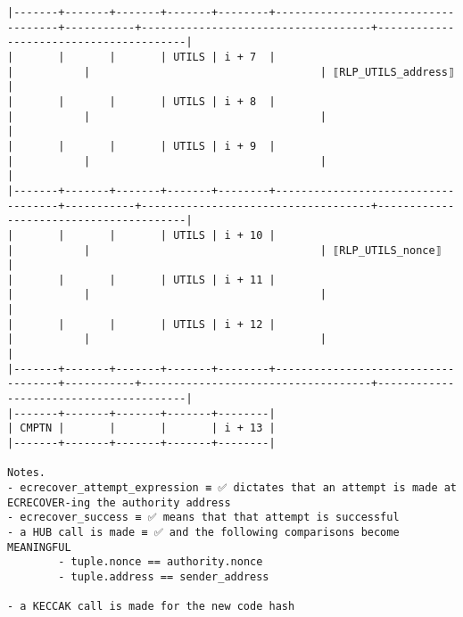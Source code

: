 \documentclass[varwidth=\maxdimen,margin=0.5cm,multi={verbatim}]{standalone}
\begin{document}
\begin{verbatim}
|-------+-------+-------+-------+--------+------------------------------------+-----------+------------------------------------+----------------------------------------|
|       |       |       | UTILS | i + 7  |                                    |           |                                    | ⟦RLP_UTILS_address⟧                    |
|       |       |       | UTILS | i + 8  |                                    |           |                                    |                                        |
|       |       |       | UTILS | i + 9  |                                    |           |                                    |                                        |
|-------+-------+-------+-------+--------+------------------------------------+-----------+------------------------------------+----------------------------------------|
|       |       |       | UTILS | i + 10 |                                    |           |                                    | ⟦RLP_UTILS_nonce⟧                      |
|       |       |       | UTILS | i + 11 |                                    |           |                                    |                                        |
|       |       |       | UTILS | i + 12 |                                    |           |                                    |                                        |
|-------+-------+-------+-------+--------+------------------------------------+-----------+------------------------------------+----------------------------------------|
|-------+-------+-------+-------+--------|
| CMPTN |       |       |       | i + 13 |
|-------+-------+-------+-------+--------|

Notes.
- ecrecover_attempt_expression ≡ ✅ dictates that an attempt is made at ECRECOVER-ing the authority address
- ecrecover_success ≡ ✅ means that that attempt is successful
- a HUB call is made ≡ ✅ and the following comparisons become MEANINGFUL
        - tuple.nonce == authority.nonce
        - tuple.address == sender_address 

- a KECCAK call is made for the new code hash

\end{verbatim}
\end{document}
